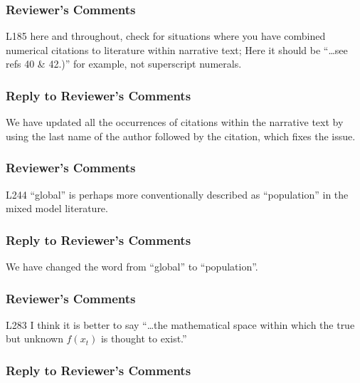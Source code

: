 \documentclass[
]{article}
\begin{document}
\hypertarget{reviewers-comments-20}{%
\subsubsection{Reviewer's Comments}\label{reviewers-comments-20}}

L185 here and throughout, check for situations where you have combined numerical citations to literature within narrative text; Here it should be ``\ldots see refs 40 \& 42.)'' for example, not superscript numerals.

\hypertarget{section-21}{%
\subsubsection{\texorpdfstring{\textcolor{reviewersblue} {Reply to Reviewer's Comments}}{}}\label{section-21}}

We have updated all the occurrences of citations within the narrative text by using the last name of the author followed by the citation, which fixes the issue.

\hypertarget{reviewers-comments-21}{%
\subsubsection{Reviewer's Comments}\label{reviewers-comments-21}}

L244 ``global'' is perhaps more conventionally described as ``population'' in the mixed model literature.

\hypertarget{section-22}{%
\subsubsection{\texorpdfstring{\textcolor{reviewersblue} {Reply to Reviewer's Comments}}{}}\label{section-22}}

We have changed the word from ``global'' to ``population''.

\hypertarget{reviewers-comments-22}{%
\subsubsection{Reviewer's Comments}\label{reviewers-comments-22}}

L283 I think it is better to say ``\ldots the mathematical space within which the true but unknown \(f(x_t)\) is thought to exist.''

\hypertarget{section-23}{%
\subsubsection{\texorpdfstring{\textcolor{reviewersblue} {Reply to Reviewer's Comments}}{}}\label{section-23}}
\end{document}
